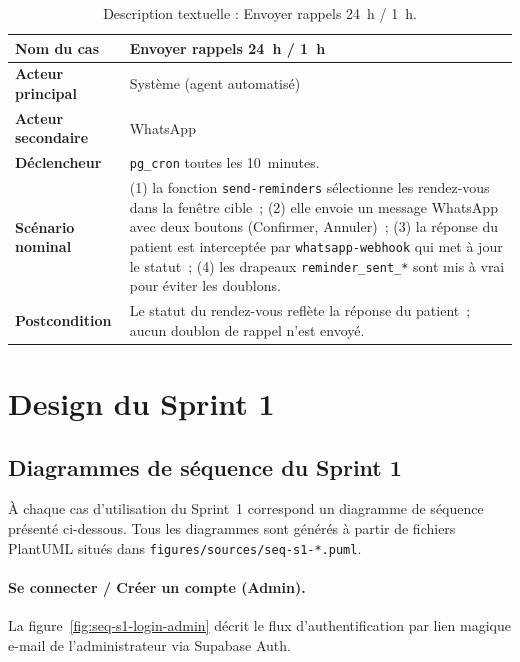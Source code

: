 \begin{table}[H]
  \centering\small
  \caption{Description textuelle : Envoyer rappels 24~h / 1~h.}
  \label{tab:uc-s1-rappel}
  \renewcommand{\arraystretch}{1.45}
  \begin{tabular}{|p{3.0cm}|>{\raggedright\arraybackslash}p{10.8cm}|}
    \hline\hline
    \textbf{Nom du cas} & Envoyer rappels 24~h / 1~h \\
    \hline
    \textbf{Acteur principal} & Système (agent automatisé) \\
    \hline
    \textbf{Acteur secondaire} & WhatsApp \\
    \hline
    \textbf{Déclencheur} & \texttt{pg\_cron} toutes les 10~minutes. \\
    \hline
    \textbf{Scénario nominal} &
      (1) la fonction \texttt{send-reminders} sélectionne les
          rendez-vous dans la fenêtre cible~;
      (2) elle envoie un message WhatsApp avec deux boutons
          (Confirmer, Annuler)~;
      (3) la réponse du patient est interceptée par
          \texttt{whatsapp-webhook} qui met à jour le statut~;
      (4) les drapeaux \texttt{reminder\_sent\_*} sont mis à vrai
          pour éviter les doublons. \\
          \hline
    \textbf{Postcondition} & Le statut du rendez-vous reflète la
      réponse du patient~; aucun doublon de rappel n'est envoyé. \\
    \hline\hline
  \end{tabular}
\end{table}

\section{Design du Sprint 1}

\subsection{Diagrammes de séquence du Sprint 1}
À chaque cas d'utilisation du Sprint~1 correspond un diagramme de
séquence présenté ci-dessous. Tous les diagrammes sont générés à
partir de fichiers PlantUML situés dans
\texttt{figures/sources/seq-s1-*.puml}.

\paragraph{Se connecter / Créer un compte (Admin).}
La figure~\ref{fig:seq-s1-login-admin} décrit le flux
d'authentification par lien magique e-mail de l'administrateur via
Supabase Auth.


